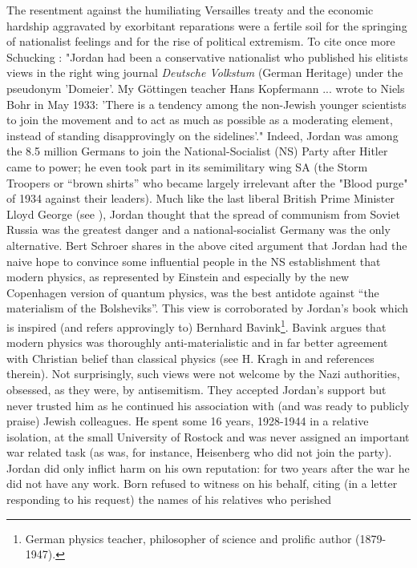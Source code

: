 \documentclass[12pt]{article}
\begin{document}
The resentment against the humiliating Versailles treaty and the economic hardship aggravated by
exorbitant reparations were a fertile soil for the springing of nationalist feelings and for the
rise of political extremism. To cite once more Schucking \cite{Sch99}: "Jordan had been a conservative nationalist who published his 
elitists views in the right wing journal {\it Deutsche Volkstum} (German Heritage) under the pseudonym 'Domeier'. My 
G\"ottingen teacher Hans Kopfermann ... wrote to Niels Bohr in May 1933: 'There is a tendency among the non-Jewish younger scientists 
to join the movement and to act as much as possible as a moderating element, instead of standing disapprovingly on the sidelines'."
Indeed, Jordan was among the 8.5 million Germans to join the National-Socialist (NS) Party after Hitler came to power; he even took part 
in its semimilitary wing SA (the Storm Troopers or ``brown shirts'' who became largely irrelevant after the "Blood purge" of 1934 against their leaders). 
Much like the last liberal British Prime Minister Lloyd George (see \cite{CMM}), Jordan thought that the spread of communism from Soviet 
Russia was the greatest danger and a national-socialist Germany was the only alternative. Bert Schroer shares
in \cite{PJ07} the above cited argument that Jordan had the naive hope to convince some influential people in the NS
establishment that modern physics, as represented by Einstein and especially by
the new Copenhagen version of quantum physics, was the best antidote against
``the materialism of the Bolsheviks''. This view is corroborated by Jordan's
book \cite{J36} which is inspired (and refers approvingly to) Bernhard Bavink\footnote{German physics
teacher, philosopher of science and prolific author (1879-1947).}. Bavink argues that modern physics
was thoroughly anti-materialistic and in far better agreement with Christian belief than classical
physics (see H. Kragh in \cite{PJ07} and references therein). Not surprisingly, such views were not
welcome by the Nazi authorities, obsessed, as they were, by antisemitism. They accepted Jordan's support
but never trusted him as he continued his association with (and was ready to publicly praise) Jewish
colleagues. He spent some 16 years, 1928-1944 in a relative isolation, at the small University of Rostock
and was never assigned an important war related task (as was, for instance, Heisenberg who did not join the
party). Jordan did only inflict harm on his own reputation: for two years after the war he did not have any
work. Born refused to witness on his behalf, citing (in a letter responding to his request) the names of his relatives who perished 
\end{document}
